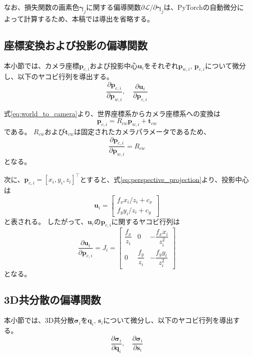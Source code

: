 \documentclass[dvipdfmx]{jlreq}
\begin{document}
なお、損失関数の画素色$\bm{\gamma}_j$に関する偏導関数$\partial\mathcal{L}/\partial\bm{\gamma}_j$は、PyTorchの自動微分によって計算するため、本稿では導出を省略する。

\subsection{座標変換および投影の偏導関数}
本小節では、カメラ座標$\bm{p}_{c,i}$および投影中心$\bm{u}_i$をそれぞれ$\bm{p}_{w,i},\,\bm{p}_{c,i}$について微分し、以下のヤコビ行列を導出する。
\begin{equation*}
    \frac{\partial\bm{p}_{c,i}}{\partial\bm{p}_{w,i}}, \quad \frac{\partial\bm{u}_i}{\partial\bm{p}_{c,i}}
\end{equation*}

式\eqref{eq:world_to_camera}より、世界座標系からカメラ座標系への変換は
\begin{equation}
    \bm{p}_{c,i}=R_{cw}\bm{p}_{w,i}+\bm{t}_{cw}
    \label{eq:backward_world_to_camera}
\end{equation}
である。
$R_{cw}$および$\bm{t}_{cw}$は固定されたカメラパラメータであるため、
\begin{equation}
    \frac{\partial\bm{p}_{c,i}}{\partial\bm{p}_{w,i}}=R_{cw}
    \label{eq:backward_world_to_camera_jacobian}
\end{equation}
となる。

次に、$\bm{p}_{c,i}=[x_i,y_i,z_i]^{\top}$とすると、式\eqref{eq:perspective_projection}より、投影中心は
\begin{equation}
    \bm{u}_i=
    \begin{bmatrix}
        f_x x_i/z_i+c_x \\
        f_y y_i/z_i+c_y
    \end{bmatrix}
    \label{eq:backward_perspective_projection}
\end{equation}
と表される。
したがって、$\bm{u}_i$の$\bm{p}_{c,i}$に関するヤコビ行列は
\begin{equation}
    \frac{\partial\bm{u}_i}{\partial\bm{p}_{c,i}} = J_i
    =\begin{bmatrix}
        \dfrac{f_x}{z_i} & 0 & -\dfrac{f_x x_i}{z_i^2} \\[1.5ex]
        0 & \dfrac{f_y}{z_i} & -\dfrac{f_y y_i}{z_i^2}
    \end{bmatrix}
    \label{eq:backward_projection_jacobian}
\end{equation}
となる。

\subsection{3D共分散の偏導関数}
本小節では、3D共分散$\bm{\sigma}_i$を$\bm{q}_i,\,\bm{s}_i$について微分し、以下のヤコビ行列を導出する。
\begin{equation*}
    \frac{\partial\bm{\sigma}_i}{\partial\bm{q}_i}, \quad \frac{\partial\bm{\sigma}_i}{\partial\bm{s}_i}
\end{equation*}
\end{document}
